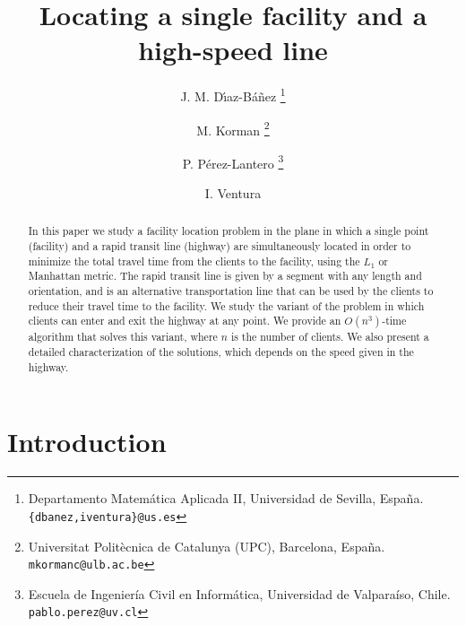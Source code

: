 \documentclass[11pt,a4paper,oneside,onecolumn]{article}
\begin{document}
\title{Locating a single facility and a high-speed line}

\author{
	J. M. D\'{\i}az-B\'{a}\~{n}ez
	\thanks{Departamento Matem\'{a}tica Aplicada II, Universidad de Sevilla, Espa\~na. 
	{\tt \{dbanez,iventura\}@us.es}} \and 
	M. Korman
	\thanks{Universitat Polit\`{e}cnica de Catalunya (UPC), Barcelona, Espa\~na.
	{\tt mkormanc@ulb.ac.be}} \and
	P. P\'{e}rez-Lantero
	\thanks{Escuela de Ingenier\'ia Civil en Inform\'atica, Universidad de Valpara\'{i}so, Chile.
	{\tt pablo.perez@uv.cl}} \and
	I. Ventura\footnotemark[1]
} 

\maketitle

\begin{abstract}
In this paper we study a facility location problem in the plane in
which a single point (facility) and a rapid transit line (highway)
are simultaneously located in order to minimize the total travel
time from the clients to the facility, using the $L_1$ or Manhattan
metric. The rapid transit line is given by a segment with any length
and orientation, and is an alternative transportation line
that can be used by the clients to reduce their travel time to the
facility. We study the variant of the problem in which clients can
enter and exit the highway at any point. We provide an $O(n^3)$-time
algorithm that solves this variant, where $n$ is the number
of clients. We also present a detailed characterization of the solutions,
which depends on the speed given in the highway.
\end{abstract}
    




\section{Introduction}\label{section:intro}
\end{document}
